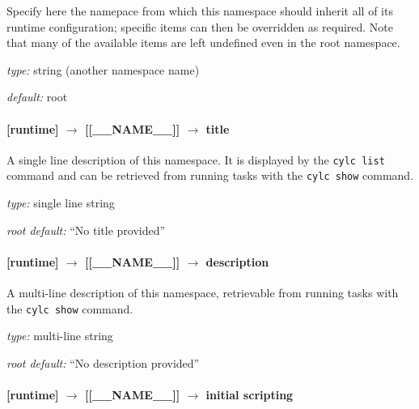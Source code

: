 Specify here the namepace from which this namespace should inherit all
of its runtime configuration; specific items can then be overridden
as required. Note that many of the available items are left undefined even
in the root namespace.

\begin{myitemize}
\item {\em type:} string (another namespace name)
\item {\em default:} root
\end{myitemize}


\paragraph[title]{[runtime] $\rightarrow$ [[\_\_NAME\_\_]] $\rightarrow$ title}

A single line description of this namespace. It is displayed by the
\lstinline=cylc list= command and can be retrieved from running tasks
with the \lstinline=cylc show= command.

\begin{myitemize}
\item {\em type:} single line string 
\item {\em root default:} ``No title provided''
\end{myitemize}

\paragraph[description]{[runtime] $\rightarrow$ [[\_\_NAME\_\_]] $\rightarrow$ description}

A multi-line description of this namespace, retrievable from running tasks with the 
\lstinline=cylc show= command.

\begin{myitemize}
\item {\em type:} multi-line string 
\item {\em root default:} ``No description provided''
\end{myitemize}


\paragraph[initial scripting]{[runtime] $\rightarrow$ [[\_\_NAME\_\_]] $\rightarrow$ initial scripting}

